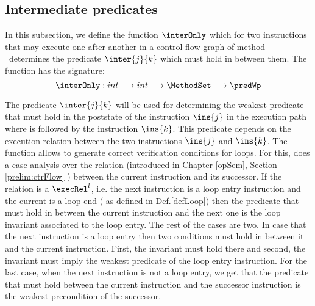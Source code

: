\newtheorem{defInter}{Definition}[subsection]
\subsection{Intermediate predicates} \label{wp:interPred}
In this subsection, we define the function $\interOnly$ which for two instructions that may execute one
after another in a control flow graph  of  method \methodd \ determines the predicate $\inter{j}{k}$ which must hold in between them.
The function has the signature:
$$ \interOnly: int \longrightarrow int  \longrightarrow \MethodSet \longrightarrow \predWp $$ 


 The predicate $\inter{j}{k}$ will be used for determining the weakest predicate that must hold in the poststate of the instruction
 $\ins{j}$ in the execution path where   is followed by the instruction $\ins{k}$.
 This predicate depends on the execution relation between the two instructions $\ins{j}$ and $\ins{k}$.
 The function \interOnly{} allows to generate correct verification conditions for loops. For this,  \inter{} does a case analysis 
 over the relation \execRel{} (introduced  in Chapter \ref{opSem}, Section \ref{prelim:ctrFlow} ) between the current instruction and its successor.
 If the relation is a $\execRel^{l}$, i.e. the next instruction is a loop entry instruction and the current is a loop end
( as defined in Def.\ref{defLoop}) 
 then the predicate that must hold in between the current instruction and the next one is the loop invariant associated to the loop entry.
The rest of the cases are two. In case that the next instruction is a loop entry then two conditions must hold in between it and the
current instruction. First, the invariant must hold there and second, the invariant must imply the weakest predicate of the loop entry instruction.
For the last case, when the next instruction is not a loop entry, we get that the predicate that must hold between the current instruction 
and the successor instruction is the weakest precondition of the successor.  


